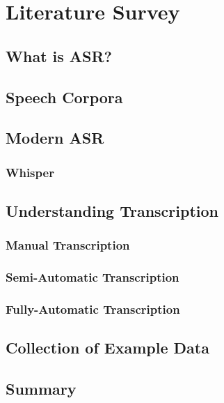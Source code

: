 \chapter{Literature Survey}\label{ch:literature-survey}

\section{What is ASR?}\label{sec:what-is-asr}

\section{Speech Corpora}\label{sec:}

\section{Modern ASR}\label{sec:modern-asr}

\subsection{Whisper}\label{subsec:whisper}

\section{Understanding Transcription}\label{sec:transcription}

\subsection{Manual Transcription}\label{subsec:manual-transcription}

\subsection{Semi-Automatic Transcription}\label{subsec:semi-auto-transcription}

\subsection{Fully-Automatic Transcription}\label{subsec:full-auto-transcription}

\section{Collection of Example Data}\label{sec:}
\section{}\label{sec:}
\section{}\label{sec:}
\section{}\label{sec:}
\section{}\label{sec:}

\section{Summary}\label{sec:lit-survey-summary}

